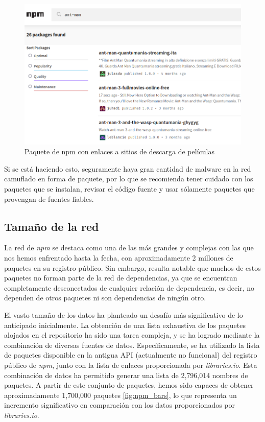 \begin{figure}[ht!]
    \begin{center}
        \includegraphics[width=1\textwidth]{img/npm/antman.png}
        \caption{Paquete de npm con enlaces a sitios de descarga de películas}
    \end{center}
    \label{fig:antman}
\end{figure}

Si se está haciendo esto, seguramente haya gran cantidad de malware en la red camuflado en forma de paquete,
por lo que se recomienda tener cuidado con los paquetes que se instalan, revisar el código fuente y usar
sólamente paquetes que provengan de fuentes fiables.

\subsection{Tamaño de la red}

La red de \textit{npm} se destaca como una de las más grandes y complejas con las que nos hemos
enfrentado hasta la fecha, con aproximadamente 2 millones de paquetes en su registro público.
Sin embargo, resulta notable que muchos de estos paquetes no forman parte de la red de dependencias,
ya que se encuentran completamente desconectados de cualquier relación de dependencia, es decir,
no dependen de otros paquetes ni son dependencias de ningún otro.

El vasto tamaño de los datos ha planteado un desafío más significativo de lo anticipado
inicialmente. La obtención de una lista exhaustiva de los paquetes alojados en el repositorio
ha sido una tarea compleja, y se ha logrado mediante la combinación de diversas fuentes de datos.
Específicamente, se ha utilizado la lista de paquetes disponible en la antigua
API (actualmente no funcional) del registro público de \textit{npm}, junto con la lista de
enlaces proporcionada por \textit{libraries.io}. Esta combinación de datos ha permitido
generar una lista de 2,796,014 nombres de paquetes. A partir de este conjunto de paquetes,
hemos sido capaces de obtener aproximadamente 1,700,000 paquetes \ref{fig:npm_bars}, lo que representa un incremento
significativo en comparación con los datos proporcionados por \textit{libraries.io}.

